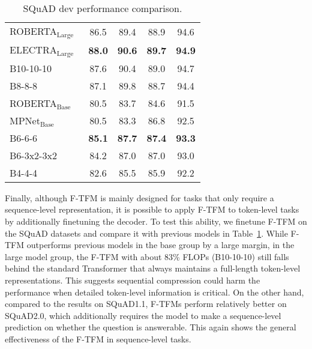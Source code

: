 \documentclass{article}
\theoremstyle{custom}
\begin{document}
\begin{table}[!ht]
\begin{minipage}{0.48\textwidth}
\begin{tabular}{lcccc}
		\cmidrule(r){1-1} \cmidrule(l){2-3} \cmidrule(l){4-5}
		ROBERTA$_\text{Large}$~\cite{liu2019roberta}
		& 86.5 & 89.4 & 88.9 & 94.6 \\
		ELECTRA$_\text{Large}$~\cite{clark2020electra}
		& \bf 88.0 & \bf 90.6 & \bf 89.7 & \bf 94.9 \\
		B10-10-10
		& 87.6 & 90.4 & 89.0 & 94.7 \\
		B8-8-8
		& 87.1 & 89.8 & 88.7 & 94.4 \\
		\cmidrule(r){1-1} \cmidrule(l){2-3} \cmidrule(l){4-5}
		ROBERTA$_\text{Base}$~\cite{liu2019roberta}
		& 80.5 & 83.7 & 84.6 & 91.5 \\
		MPNet$_\text{Base}$~\cite{lin2015hierarchical}
		& 80.5 & 83.3 & 86.8 & 92.5\\
		B6-6-6
		& \bf 85.1 & \bf 87.7 & \bf 87.4 & \bf 93.3 \\
		B6-3x2-3x2
		& 84.2 & 87.0 & 87.0 & 93.0 \\
		B4-4-4
		& 82.6 & 85.5 & 85.9 & 92.2 \\
		\bottomrule  
	\end{tabular}
	\caption{SQuAD dev performance comparison.}
	\label{tab:squad}
\end{minipage}
\vspace{-2em}
\end{table}
Finally, although F-TFM is mainly designed for tasks that only require a sequence-level representation, it is possible to apply F-TFM to token-level tasks by additionally finetuning the decoder.
To test this ability, we finetune F-TFM on the SQuAD datasets and compare it with previous models in Table~\ref{tab:squad}.
While F-TFM outperforms previous models in the base group by a large margin, in the large model group, the F-TFM with about 83\% FLOPs (B10-10-10) still falls behind the standard Transformer that always maintains a full-length token-level representations.
This suggests sequential compression could harm the performance when detailed token-level information is critical.
On the other hand, compared to the results on SQuAD1.1, F-TFMs perform relatively better on SQuAD2.0, which additionally requires the model to make a sequence-level prediction on whether the question is answerable.
This again shows the general effectiveness of the F-TFM in sequence-level tasks.
\end{document}
